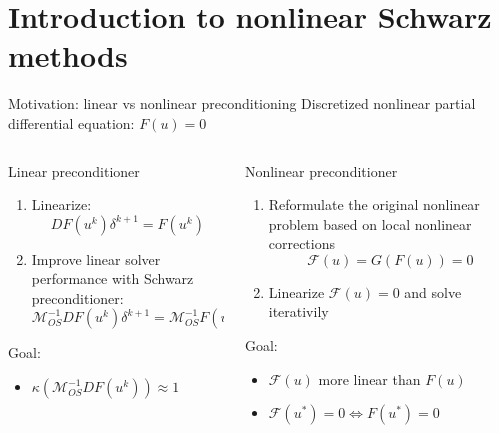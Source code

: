 \section{Introduction to nonlinear Schwarz methods}

\begin{frame}{Motivation: linear vs nonlinear preconditioning}
	Discretized nonlinear partial differential equation: $F(u) = 0$
	\begin{columns}
		\begin{column}{0.5\textwidth}
			\vspace*{-4mm}
			\begin{block}{\normalsize Linear preconditioner}
				\begin{enumerate}
					\item Linearize:
					      \begin{equation*}
						      DF(u^k)\delta^{k+1} = F(u^k)
					      \end{equation*}
					\item Improve linear solver performance with Schwarz preconditioner:
					      \begin{equation*}
						      \mathcal{M}_{OS}^{-1}DF(u^k)\delta^{k+1} = \mathcal{M}_{OS}^{-1}F(u^k)
					      \end{equation*}
				\end{enumerate}
				\vspace*{4mm}
				Goal:
				\begin{itemize}
					\item $\kappa(\mathcal{M}_{OS}^{-1}DF(u^k)) \approx 1$
				\end{itemize}
			\end{block}
		\end{column}
		\begin{column}{0.5\textwidth}
			\vspace*{-4mm}
			\begin{block}{\normalsize Nonlinear preconditioner}
				\begin{enumerate}
					\item Reformulate the original nonlinear problem based on local nonlinear corrections
					      \begin{equation}
						      \mathcal{F}(u) = G(F(u)) = 0
					      \end{equation}
					\item Linearize $\mathcal{F}(u) = 0$ and solve iterativily
				\end{enumerate}
				Goal:
				\begin{itemize}
					\item $\mathcal{F}(u)$ more linear than $F(u)$
					\item $\mathcal{F}(u^*) = 0 \iff F(u^*) = 0$
				\end{itemize}
			\end{block}
		\end{column}
	\end{columns}
\end{frame}

